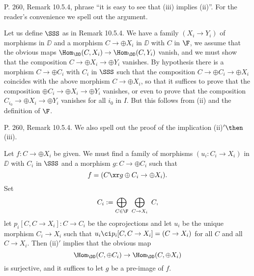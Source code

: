 \documentclass[12pt]{article}
\theoremstyle{remark}
\theoremstyle{definition}
\begin{document}


\begin{s}
P. 260, Remark 10.5.4, phrase ``it is easy to see that (iii) implies (ii)''. For the reader's convenience we spell out the argument. 

Let us define $\SSS$ as in Remark 10.5.4. We have a family $(X_i\to Y_i)$ of morphisms in $\DD$ and a morphism $C\to\oplus X_i$ in $\DD$ with $C$ in $\F$, we assume that the obvious maps $\Hom_\DD(C,X_i)\to\Hom_\DD(C,Y_i)$ vanish, and we must show that the composition $C\to\oplus X_i\to\oplus Y_i$ vanishes. By hypothesis there is a morphism $C\to\oplus C_i$ with $C_i$ in $\SSS$ such that the composition $C\to\oplus C_i\to\oplus X_i$ coincides with the above morphism $C\to\oplus X_i$, so that it suffices to prove that the composition $\oplus C_i\to\oplus X_i\to\oplus Y_i$ vanishes, or even to prove that the composition $C_{i_0}\to\oplus X_i\to\oplus Y_i$ vanishes for all $i_0$ in $I$. But this follows from (ii) and the definition of $\F$.
\end{s}

%

\begin{s}
P. 260, Remark 10.5.4. We also spell out the proof of the implication (ii)$'\then$(iii). 

Let $f:C\to\oplus X_i$ be given. We must find a family of morphisms $(u_i:C_i\to X_i)$ in $\DD$ with $C_i$ in $\SSS$ and a morphism $g:C\to\oplus C_i$ such that 
$$
f=(C\xr g\oplus C_i\to\oplus X_i).
$$ 
Set 
$$
C_i:=\bigoplus_{C\in\F}\ \bigoplus_{C\to X_i}\ C,
$$ 
let $p_i[C,C\to X_i]:C\to C_i$ be the coprojections and let $u_i$ be the unique morphism $C_i\to X_i$ such that $u_i\ci p_i[C,C\to X_i]=(C\to X_i)$ for all $C$ and all $C\to X_i$. Then (ii)$'$ implies that the obvious map 
$$
\Hom_\DD(C,\oplus C_i)\to\Hom_\DD(C,\oplus X_i)
$$ 
is surjective, and it suffices to let $g$ be a pre-image of $f$.
\end{s}

\end{document}
